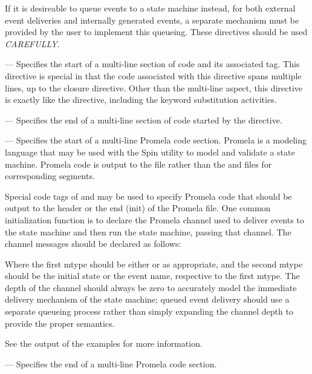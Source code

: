 \begin{description}
\begin{description}
  If it is desireable to queue events to a state machine instead, for
  both external event deliveries and internally generated events, a
  separate mechanism must be provided by the user to implement this
  queueing.  These directives should be used {\em CAREFULLY}.

\end{description}

\item[\hypertarget{CODEbegin}{\smg{CODE_\{}}] --- Specifies the start
  of a multi-line section of code and its associated tag.  This
  directive is special in that the code associated with this directive
  spans multiple lines, up to the closure directive.  Other than the
  multi-line aspect, this directive is exactly like the 
  directive, including the keyword substitution activities.
    
\item[\hypertarget{CODEend}{\smg{CODE_\}}}] --- Specifies the end of a
  multi-line section of code started by the \CODEbegin directive.
  
\item[\hypertarget{PROMELAbegin}{\smg{PROMELA_\{}}] --- Specifies the
  start of a multi-line Promela code section.  Promela is a modeling
  language that may be used with the Spin utility to model and
  validate a state machine.  Promela code is output to the 
  file rather than the  and  files for corresponding
  \CODE segments.
  
  Special code tags of  and  may be used to
  specify Promela code that should be output to the header or the end
  (init) of the Promela file.  One common initialization function is
  to declare the Promela channel used to deliver events to the state
  machine and then run the state machine, passing that channel.  The
  channel messages should be declared as follows:
  
  
  Where the first mtype should be either  or
   as appropriate, and the second mtype should be the
  initial state or the event name, respective to the first mtype.  The
  depth of the channel should always be zero to accurately model the
  immediate delivery mechanism of the state machine; queued event
  delivery should use a separate queueing process rather than simply
  expanding the channel depth to provide the proper semantics.
  
  See the output of the examples for more information.
  
\item[\hypertarget{PROMELAend}{\smg{PROMELA_\}}}] --- Specifies the
  end of a multi-line Promela code section.

\end{description}



